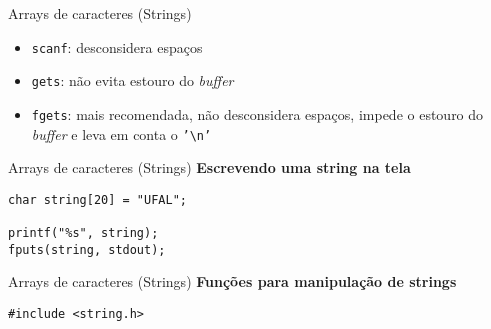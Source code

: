 \documentclass[10pt]{beamer}
\begin{document}
\begin{frame}{Arrays de caracteres (Strings)}
    \Large
    \begin{itemize}
        \item [\faThumbsODown] \texttt{scanf}: desconsidera espaços
        \item [\faThumbsODown] \texttt{gets}: não evita estouro do \textit{buffer}
        \item [\faThumbsOUp] \texttt{fgets}: mais recomendada, não desconsidera espaços, impede o estouro do \textit{buffer} e leva em conta o \texttt{'\textbackslash n'}
    \end{itemize}
\end{frame}

\begin{frame}[fragile]{Arrays de caracteres (Strings)}
    \huge \textbf{Escrevendo uma string na tela}

    \bigskip

    \Large
    \begin{verbatim}
char string[20] = "UFAL";

printf("%s", string);
fputs(string, stdout);
    \end{verbatim}
\end{frame}

\begin{frame}[fragile]{Arrays de caracteres (Strings)}
    \huge \textbf{Funções para manipulação de strings}

    \bigskip

    \begin{verbatim}
#include <string.h>
    \end{verbatim}
\end{frame}
\end{document}
